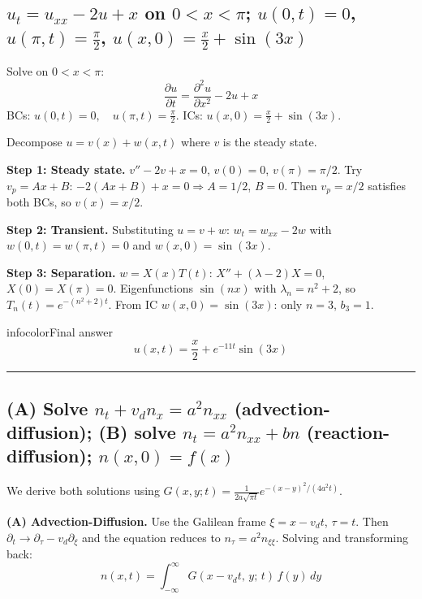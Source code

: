 \documentclass[a4paper,11pt]{article} %
\newenvironment{summarybox}[1][]{\begin{custombox}[#1]{infocolor}{Final answer}}{\end{custombox}}
\begin{document}
\subsection{\texorpdfstring{$u_t = u_{xx} - 2u + x$ on $0<x<\pi$; $u(0,t)=0$, $u(\pi,t)=\tfrac{\pi}{2}$, $u(x,0)=\tfrac{x}{2}+\sin(3x)$}{Solve heat-reaction PDE via steady-state decomposition; exponential decay transient}}

\begin{problembox}
Solve on $0 < x < \pi$:
$$\frac{\partial u}{\partial t} = \frac{\partial^2 u}{\partial x^2} - 2u + x$$
BCs: $u(0, t) = 0, \quad u(\pi, t) = \frac{\pi}{2}$.
ICs: $u(x, 0) = \frac{x}{2} + \sin(3x)$.
\end{problembox}


Decompose $u=v(x)+w(x,t)$ where $v$ is the steady state.

\textbf{Step 1: Steady state.} $v''-2v+x=0$, $v(0)=0$, $v(\pi)=\pi/2$.
Try $v_p=Ax+B$: $-2(Ax+B)+x=0\Rightarrow A=1/2$, $B=0$. Then $v_p=x/2$ satisfies both BCs, so $v(x)=x/2$.

\textbf{Step 2: Transient.} Substituting $u=v+w$: $w_t=w_{xx}-2w$ with $w(0,t)=w(\pi,t)=0$ and $w(x,0)=\sin(3x)$.

\textbf{Step 3: Separation.} $w=X(x)T(t)$: $X''+(\lambda-2)X=0$, $X(0)=X(\pi)=0$. Eigenfunctions $\sin(nx)$ with $\lambda_n=n^2+2$, so $T_n(t)=e^{-(n^2+2)t}$.
From IC $w(x,0)=\sin(3x)$: only $n=3$, $b_3=1$.

\begin{summarybox}
$$ u(x,t) = \frac{x}{2} + e^{-11t}\sin(3x) $$
\end{summarybox}
\hrule
\subsection{\texorpdfstring{(A) Solve $n_t + v_d n_x = a^2 n_{xx}$ (advection-diffusion); (B) solve $n_t = a^2 n_{xx} + bn$ (reaction-diffusion); $n(x,0)=f(x)$}{(A) Galilean transform removes drift; (B) exponential substitution removes reaction term}}

We derive both solutions using $G(x,y;t)=\frac{1}{2a\sqrt{\pi t}}e^{-(x-y)^2/(4a^2t)}$.

\textbf{(A) Advection-Diffusion.} Use the Galilean frame $\xi=x-v_d t$, $\tau=t$. Then $\partial_t\to\partial_\tau-v_d\partial_\xi$ and the equation reduces to $n_\tau=a^2 n_{\xi\xi}$. Solving and transforming back:
\begin{equation}
    \boxed{ n(x,t) = \int_{-\infty}^{\infty} G(x-v_d t,\,y;\,t)\,f(y)\,dy }
\end{equation}
\end{document}
